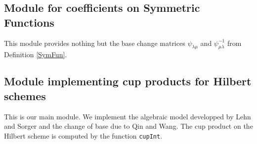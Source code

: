 \subsection{Module for coefficients on Symmetric Functions} 
This module provides nothing but the base change matrices $\psi_{\lambda\mu}$ and $\psi^{-1}_{\mu\lambda}$ from Definition \ref{SymFun}.
 
\subsection{Module implementing cup products for Hilbert schemes} This is our main module. We implement the algebraic model developped by Lehn and Sorger and the change of base due to Qin and Wang. The cup product on the Hilbert scheme is computed by the function \texttt{cupInt}.

 
